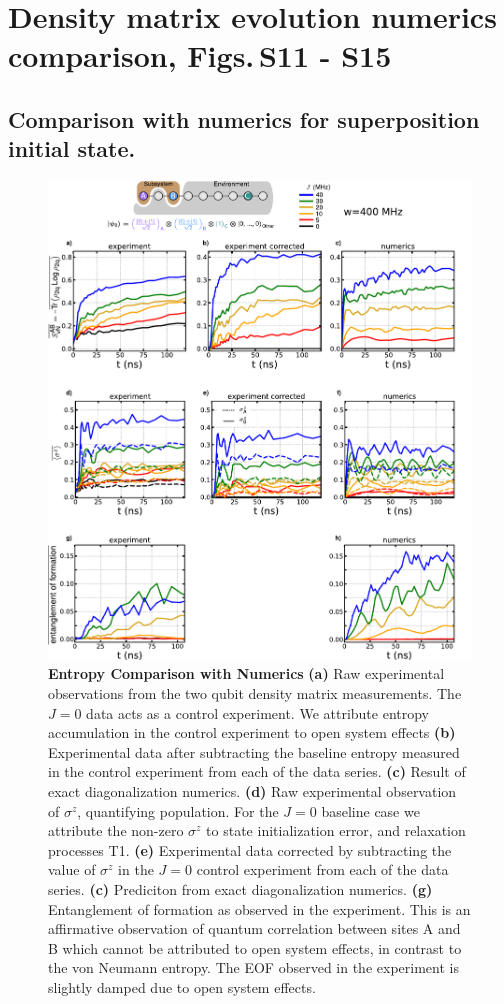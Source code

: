 \section{Density matrix evolution numerics comparison, Figs.\,S11 - S15}
\subsection{Comparison with numerics for superposition initial state.}
\begin{figure}[tbh]
\centering
\includegraphics[width=140mm, keepaspectratio]{./PDF/dat_cor_num_superposition_linear.pdf}
\caption{\textbf{Entropy Comparison with Numerics}
\textbf{(a)} Raw experimental observations from the two qubit density matrix measurements.  The $J=0$ data acts as a control experiment.
We attribute entropy accumulation in the control experiment to open system effects
\textbf{(b)} Experimental data after subtracting the baseline entropy measured in the control experiment from each of the data series.
\textbf{(c)} Result of exact diagonalization numerics.
\textbf{(d)} Raw experimental observation of $\sigma^z$, quantifying population.
For the $J=0$ baseline case we attribute the non-zero $\sigma^z$ to state initialization error, and relaxation processes T1.
\textbf{(e)} Experimental data corrected by subtracting the value of $\sigma^z$ in the $J=0$ control experiment from each of the data series.
\textbf{(c)} Prediciton from exact diagonalization numerics.
\textbf{(g)} Entanglement of formation as observed in the experiment.
This is an affirmative observation of quantum correlation between sites A and B which cannot be attributed to open system effects, in contrast to the von Neumann entropy.
The EOF observed in the experiment is slightly damped due to open system effects.}
\end{figure}

